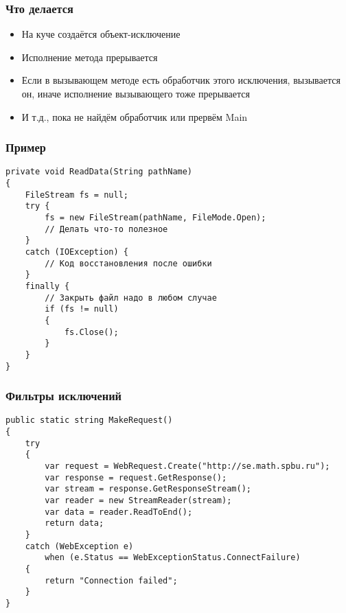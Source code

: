 \documentclass[xetex,mathserif,serif]{beamer}
\begin{document}
    \begin{frame}
        \frametitle{Что делается}
        \begin{itemize}
            \item На куче создаётся объект-исключение
            \item Исполнение метода прерывается
            \item Если в вызывающем методе есть обработчик этого исключения, вызывается он, иначе исполнение вызывающего тоже прерывается
            \item И т.д., пока не найдём обработчик или прервём Main
        \end{itemize}
    \end{frame}

    \begin{frame}[fragile]
        \frametitle{Пример}
        \begin{small}
            \begin{verbatim}
private void ReadData(String pathName) 
{
    FileStream fs = null;
    try {
        fs = new FileStream(pathName, FileMode.Open);
        // Делать что-то полезное
    }
    catch (IOException) {
        // Код восстановления после ошибки
    }
    finally {
        // Закрыть файл надо в любом случае
        if (fs != null) 
        {
            fs.Close();
        }
    }
}
            \end{verbatim}
        \end{small}
    \end{frame}

    \begin{frame}[fragile]
        \frametitle{Фильтры исключений}
        \begin{small}
            \begin{verbatim}
public static string MakeRequest()
{
    try
    {
        var request = WebRequest.Create("http://se.math.spbu.ru");
        var response = request.GetResponse();
        var stream = response.GetResponseStream();
        var reader = new StreamReader(stream);
        var data = reader.ReadToEnd();
        return data;
    }
    catch (WebException e) 
        when (e.Status == WebExceptionStatus.ConnectFailure)
    {
        return "Connection failed";
    }
}
            \end{verbatim}
        \end{small}
    \end{frame}
\end{document}
